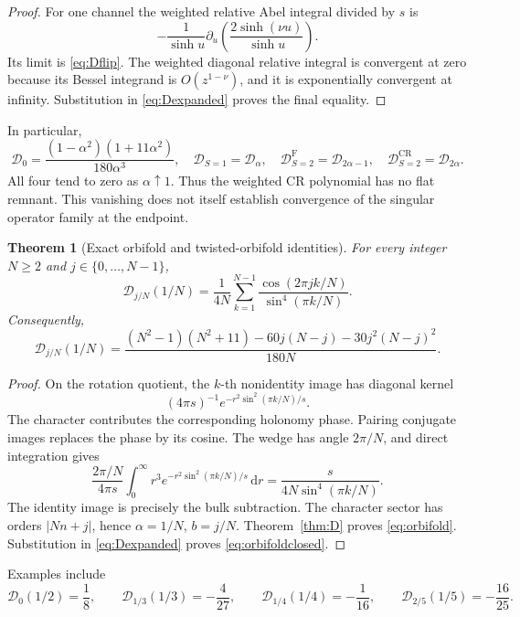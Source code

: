 \documentclass[11pt,a4paper]{article}
\newcommand{\dd}{\mathrm d}
\newcommand{\Fr}{\mathrm F}
\newcommand{\CR}{\mathrm{CR}}
\newcommand{\abs}[1]{\lvert#1\rvert}
\newcommand{\Dcal}{\mathcal D}
\theoremstyle{plain}
\newtheorem{theorem}{Theorem}[section]
\theoremstyle{definition}
\theoremstyle{remark}
\numberwithin{equation}{section}
\begin{document}
\begin{proof}
For one channel the weighted relative Abel integral divided by
\(s\) is
\[
 -\frac1{\sinh u}\partial_u
       \left(\frac{2\sinh(\nu u)}{\sinh u}\right).
\]
Its limit is \eqref{eq:Dflip}. The weighted diagonal relative
integral is convergent at zero because its Bessel integrand is
\(O(z^{1-\nu})\), and it is exponentially convergent at infinity.
Substitution in \eqref{eq:Dexpanded} proves the final equality.
\end{proof}

In particular,
\[
 \Dcal_0
 =\frac{(1-\alpha^2)(1+11\alpha^2)}{180\alpha^3},
 \quad
 \Dcal_{S=1}=\Dcal_\alpha,
 \quad
 \Dcal_{S=2}^\Fr=\Dcal_{2\alpha-1},
 \quad
 \Dcal_{S=2}^\CR=\Dcal_{2\alpha}.
\]
All four tend to zero as \(\alpha\uparrow1\).
Thus the weighted CR polynomial has no flat remnant.
This vanishing does not itself establish convergence of the
singular operator family at the endpoint.

\begin{theorem}[Exact orbifold and twisted-orbifold identities]
\label{thm:orbifold}
For every integer \(N\ge2\) and \(j\in\{0,\ldots,N-1\}\),
\begin{equation}
 \Dcal_{j/N}(1/N)
 =\frac1{4N}\sum_{k=1}^{N-1}
       \frac{\cos(2\pi jk/N)}{\sin^4(\pi k/N)}.
 \label{eq:orbifold}
\end{equation}
Consequently,
\begin{equation}
 \Dcal_{j/N}(1/N)
 =
 \frac{(N^2-1)(N^2+11)
       -60j(N-j)-30j^2(N-j)^2}{180N}.
 \label{eq:orbifoldclosed}
\end{equation}
\end{theorem}

\begin{proof}
On the rotation quotient, the \(k\)-th nonidentity image has
diagonal kernel
\[
 (4\pi s)^{-1}
       e^{-r^2\sin^2(\pi k/N)/s}.
\]
The character contributes the corresponding holonomy phase.
Pairing conjugate images replaces the phase by its cosine.
The wedge has angle \(2\pi/N\), and direct integration gives
\[
 \frac{2\pi/N}{4\pi s}
 \int_0^\infty r^3
 e^{-r^2\sin^2(\pi k/N)/s}\,\dd r
 =\frac{s}{4N\sin^4(\pi k/N)}.
\]
The identity image is precisely the bulk subtraction.
The character sector has orders \(\abs{Nn+j}\), hence
\(\alpha=1/N\), \(b=j/N\).
Theorem~\ref{thm:D} proves \eqref{eq:orbifold}.
Substitution in \eqref{eq:Dexpanded} proves
\eqref{eq:orbifoldclosed}.
\end{proof}

Examples include
\[
 \Dcal_0(1/2)=\frac18,\qquad
 \Dcal_{1/3}(1/3)=-\frac4{27},\qquad
 \Dcal_{1/4}(1/4)=-\frac1{16},\qquad
 \Dcal_{2/5}(1/5)=-\frac{16}{25}.
\]
\end{document}
